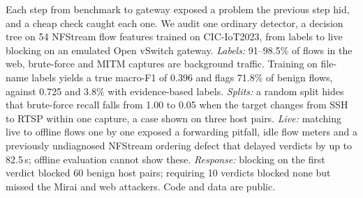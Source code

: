 Each step from benchmark to gateway exposed a problem the previous step hid, and a cheap check caught each one. We audit one ordinary detector, a decision tree on 54 NFStream flow features trained on CIC-IoT2023, from labels to live blocking on an emulated Open vSwitch gateway. \emph{Labels:} 91--98.5\% of flows in the web, brute-force and MITM captures are background traffic. Training on file-name labels yields a true macro-F1 of 0.396 and flags 71.8\% of benign flows, against 0.725 and 3.8\% with evidence-based labels. \emph{Splits:} a random split hides that brute-force recall falls from 1.00 to 0.05 when the target changes from SSH to RTSP within one capture, a case shown on three host pairs. \emph{Live:} matching live to offline flows one by one exposed a forwarding pitfall, idle flow meters and a previously undiagnosed NFStream ordering defect that delayed verdicts by up to 82.5\,s; offline evaluation cannot show these. \emph{Response:} blocking on the first verdict blocked 60 benign host pairs; requiring 10 verdicts blocked none but missed the Mirai and web attackers. Code and data are public.
